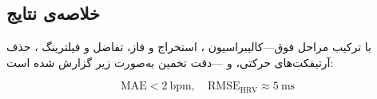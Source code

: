\subsection*{خلاصه‌ی نتایج}
\label{sec:summary}

با ترکیب مراحل فوق—کالیبراسیون ، استخراج و  فاز، تفاضل و فیلترینگ ، حذف آرتیفکت‌های حرکتی،  و —دقت تخمین  به‌صورت زیر گزارش شده است:

\begin{equation}
\mathrm{MAE} < 2\ \mathrm{bpm},\quad \mathrm{RMSE_{HRV}} \approx 5\ \mathrm{ms}
\label{eq:hr_final_results}
\end{equation}
